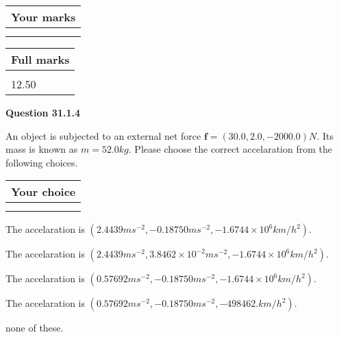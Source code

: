 \documentclass[12pt]{article}
\begin{document}
 
 

 

 
\vspace{0.3in}
  
\vspace{0.2in}
  
         \begin{tabular}{|l|}
\hline
 Your marks  \\
\hline
 \\ 
 \\ 
\hline
\end{tabular}
\hspace{0.05in} \begin{tabular}{|l|}
\hline
 Full marks  \\
\hline
 \\ 
12.50 \\
\hline
\end{tabular}
{\textbf{\Large{Question
31.1.4 
}}}
  
  
 
An object is subjected to an external net force $\mathbf{f}=(
30.0 ,
2.0,
-2000.0  )N$. Its mass is known as
$m= %
52.0  kg$. Please choose the correct accelaration
from the following choices.
 
  
  
\noindent\hspace{3.0in} \begin{tabular}{|l|}
\hline
Your choice \\
\hline
 \\ 
 \\ 
\hline
\end{tabular}
  
  
 
 
The accelaration is
$(
2.4439ms^{-2},
-0.18750ms^{-2},
-1.6744 \times 10^{6}km/h^2
).
$
 
 
The accelaration is
$(
2.4439ms^{-2},
3.8462 \times 10^{-2}ms^{-2},
-1.6744 \times 10^{6}km/h^2
).
$
 
 
The accelaration is
$(
0.57692ms^{-2},
-0.18750ms^{-2},
-1.6744 \times 10^{6}km/h^2
).
$
 
 
The accelaration is
$(
0.57692ms^{-2},
-0.18750ms^{-2},
-498462.km/h^2
).
$
 
 
none of these.
 
 
 
 
\end{document}
